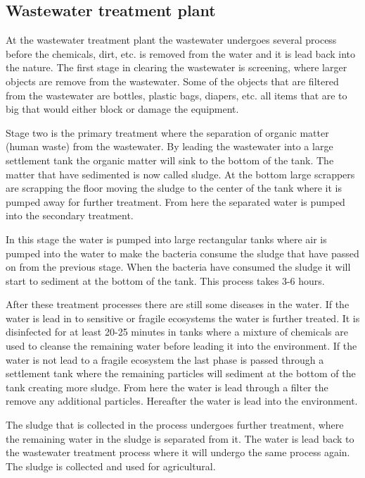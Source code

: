 
\subsection{Wastewater treatment plant}\label{subse:Wastewater treatment plant}
At the wastewater treatment plant the wastewater undergoes several process before the chemicals, dirt, etc. is removed from the water and it is lead back into the nature. The first stage in clearing the wastewater is screening, where larger objects are remove from the wastewater. Some of the objects that are filtered from the wastewater are bottles, plastic bags, diapers, etc. all items that are to big that would either block or damage the equipment. 

Stage two is the primary treatment where the separation of organic matter (human waste) from the wastewater. By leading the wastewater into a large settlement tank the organic matter will sink to the bottom of the tank. The matter that have sedimented is now called sludge. At the bottom large scrappers are scrapping the floor moving the sludge to the center of the tank where it is pumped away for further treatment. From here the separated water is pumped into the secondary treatment. 

In this stage the water is pumped into large rectangular tanks where air is pumped into the water to make the bacteria consume the sludge that have passed on from the previous stage. When the bacteria have consumed the sludge it will start to sediment at the bottom of the tank. This process takes 3-6 hours.  

After these treatment processes there are still some diseases in the water. If the water is lead in to sensitive or fragile ecosystems the water is further treated. It is disinfected for at least 20-25 minutes in tanks where a mixture of chemicals are used to cleanse the remaining water before leading it into the environment. If the water is not lead to a fragile ecosystem the last phase is passed through a settlement tank where the remaining particles will sediment at the bottom of the tank creating more sludge. From here the water is lead through a filter the remove any additional particles. Hereafter the water is lead into the environment. 

The sludge that is collected in the process undergoes further treatment, where the remaining water in the sludge is separated from it. The water is lead back to the wastewater treatment process where it will undergo the same process again. The sludge is collected and used for agricultural.





